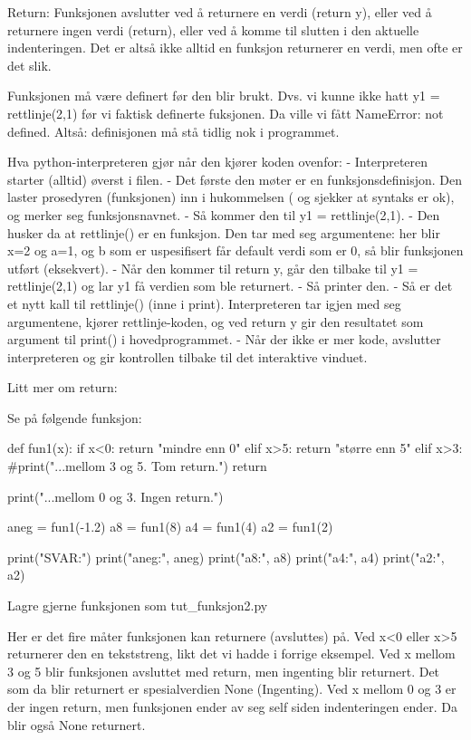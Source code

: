 {Return: 
Funksjonen avslutter ved å returnere en verdi (return y), 
eller ved å returnere ingen verdi (return), 
eller ved å komme til slutten i den aktuelle indenteringen. 
Det er altså ikke alltid en funksjon returnerer en verdi, men ofte er det slik. 


Funksjonen må være definert før den blir brukt. 
Dvs. vi kunne ikke hatt y1 = rettlinje(2,1) før vi faktisk definerte fuksjonen. 
Da ville vi fått NameError: not defined. 
Altså: definisjonen må stå tidlig nok i programmet. 


Hva python-interpreteren gjør når den kjører koden ovenfor:
- Interpreteren starter (alltid) øverst i filen.
- Det første den møter er en funksjonsdefinisjon. 
  Den laster prosedyren (funksjonen) inn i hukommelsen (
  og sjekker at syntaks er ok), og merker seg funksjonsnavnet. 
- Så kommer den til y1 = rettlinje(2,1).
- Den husker da at rettlinje() er en funksjon. Den tar med seg argumentene: 
  her blir x=2 og a=1, og b som er uspesifisert får default verdi som er 0, 
  så blir funksjonen utført (eksekvert). 
- Når den kommer til return y, går den tilbake til y1 = rettlinje(2,1) 
  og lar y1 få verdien som ble returnert.
- Så printer den. 
- Så er det et nytt kall til rettlinje() (inne i print). 
  Interpreteren tar igjen med seg argumentene, kjører rettlinje-koden, 
  og ved return y gir den resultatet som argument til print() i hovedprogrammet.
- Når der ikke er mer kode, avslutter interpreteren og gir kontrollen 
  tilbake til det interaktive vinduet. 



Litt mer om return:

Se på følgende funksjon: 

def fun1(x):
   if x<0:
      return "mindre enn 0"
   elif x>5:
      return "større enn 5"
   elif x>3: 
      #print("...mellom 3 og 5. Tom return.")
      return

   print("...mellom 0 og 3. Ingen return.")

aneg = fun1(-1.2)
a8 = fun1(8)
a4 = fun1(4)
a2 = fun1(2)

print("SVAR:") 
print("aneg:", aneg)
print("a8:", a8)
print("a4:", a4)
print("a2:", a2)

Lagre gjerne funksjonen som tut_funksjon2.py

Her er det fire måter funksjonen kan returnere (avsluttes) på.
Ved x<0 eller x>5 returnerer den en tekststreng, likt det vi hadde i forrige eksempel.
Ved x mellom 3 og 5 blir funksjonen avsluttet med return, men ingenting blir returnert.
Det som da blir returnert er spesialverdien None (Ingenting).
Ved x mellom 0 og 3 er der ingen return, men funksjonen ender av seg self siden 
indenteringen ender. Da blir også None returnert.

}
